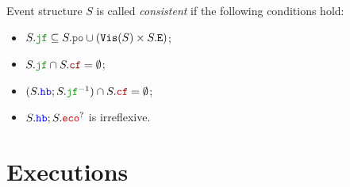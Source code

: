 \documentclass[12pt]{article}
\begin{document}
\begin{definition}
  Event structure $S$ is called \emph{consistent} if the following conditions hold:
  
  \begin{itemize}

    \item $S.\lJF \subseteq S.\lPO \cup (\lVIS(S) \times S.\lE)$;

    \item $S.\lJF \cap S.\lCF = \emptyset$;

    \item $(S.\lHB;S.\lJF^{-1}) \cap S.\lCF = \emptyset$;

    \item $S.\lHB;S.\lECO^?$ is irreflexive.
  \end{itemize}
\end{definition}

\section{Executions}
\end{document}
